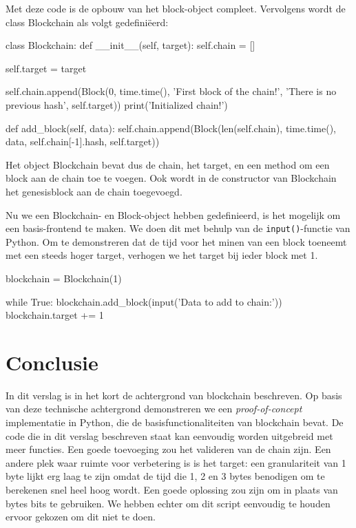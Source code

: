 \documentclass{article}
\begin{document}
Met deze code is de opbouw van het block-object compleet. Vervolgens wordt de class Blockchain als volgt gedefiniëerd:

\begin{python3code}
class Blockchain:
    def __init__(self, target):
        self.chain = []

        self.target = target

        self.chain.append(Block(0, time.time(), 'First block of the chain!',
                                'There is no previous hash', self.target))
        print('Initialized chain!')

    def add_block(self, data):
        self.chain.append(Block(len(self.chain), time.time(), data, 
                                self.chain[-1].hash, self.target))
\end{python3code}	
Het object Blockchain bevat dus de chain, het target, en een method om een block aan de chain toe te voegen. Ook wordt in de constructor van Blockchain het genesisblock aan de chain toegevoegd.

Nu we een Blockchain- en Block-object hebben gedefinieerd, is het mogelijk om een basis-frontend te maken. We doen dit met behulp van de \texttt{input()}-functie van Python. Om te demonstreren dat de tijd voor het minen van een block toeneemt met een steeds hoger target, verhogen we het target bij ieder block met 1.

\begin{python3code}
blockchain = Blockchain(1)

while True:
    blockchain.add_block(input('Data to add to chain:'))
    blockchain.target += 1
\end{python3code}


\section{Conclusie}
In dit verslag is in het kort de achtergrond van blockchain beschreven. Op basis van deze technische achtergrond demonstreren we een \textit{proof-of-concept} implementatie in Python, die de basisfunctionaliteiten van blockchain bevat.
De code die in dit verslag beschreven staat kan eenvoudig worden uitgebreid met meer functies. Een goede toevoeging zou het valideren van de chain zijn. Een andere plek waar ruimte voor verbetering is is het target: een granulariteit van 1 byte lijkt erg laag te zijn omdat de tijd die 1, 2 en 3 bytes benodigen om te berekenen snel heel hoog wordt. Een goede oplossing zou zijn om in plaats van bytes bits te gebruiken. We hebben echter om dit script eenvoudig te houden ervoor gekozen om dit niet te doen. 
\end{document}
